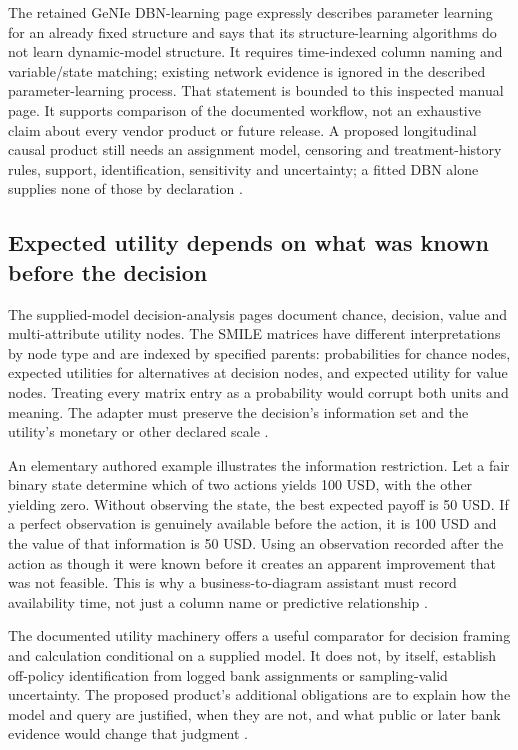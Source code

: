 The retained GeNIe DBN-learning page expressly describes parameter learning
for an already fixed structure and says that its structure-learning
algorithms do not learn dynamic-model structure. It requires time-indexed
column naming and variable/state matching; existing network evidence is
ignored in the described parameter-learning process. That statement is
bounded to this inspected manual page. It supports comparison of the
documented workflow, not an exhaustive claim about every vendor product or
future release. A proposed longitudinal causal product still needs an
assignment model, censoring and treatment-history rules, support,
identification, sensitivity and uncertainty; a fitted DBN alone supplies
none of those by declaration
\citep{exec13_ct_genie_learning,exec24_smile_choice}.

\subsection{Expected utility depends on what was known before the decision}
The supplied-model decision-analysis pages document chance, decision,
value and multi-attribute utility nodes. The SMILE matrices have different
interpretations by node type and are indexed by specified parents:
probabilities for chance nodes, expected utilities for alternatives at
decision nodes, and expected utility for value nodes. Treating every matrix
entry as a probability would corrupt both units and meaning. The adapter
must preserve the decision's information set and the utility's monetary
or other declared scale \citep{exec16_cp_bayesfusion}.

An elementary authored example illustrates the information restriction.
Let a fair binary state determine which of two actions yields 100 USD,
with the other yielding zero. Without observing the state, the best
expected payoff is 50 USD. If a perfect observation is genuinely available
before the action, it is 100 USD and the value of that information is
50 USD. Using an observation recorded after the action as though it were
known before it creates an apparent improvement that was not feasible.
This is why a business-to-diagram assistant must record availability time,
not just a column name or predictive relationship
\citep{exec24_smile_choice}.

The documented utility machinery offers a useful comparator for decision
framing and calculation conditional on a supplied model. It does not, by
itself, establish off-policy identification from logged bank assignments or
sampling-valid uncertainty. The proposed product's additional obligations
are to explain how the model and query are justified, when they are not,
and what public or later bank evidence would change that judgment
\citep{exec16_cp_bayesfusion,exec24_smile_choice}.

